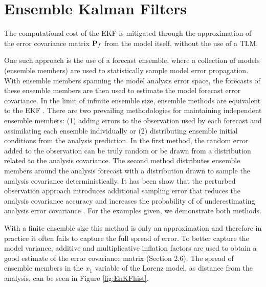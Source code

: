 \documentclass[12pt]{report}
\begin{document}
\section{Ensemble Kalman Filters}

The computational cost of the EKF is mitigated through the approximation of the error covariance matrix $\mathbf{P}_f$ from the model itself, without the use of a TLM.

One such approach is the use of a forecast ensemble, where a collection of models (ensemble members) are used to statistically sample model error propagation.
With ensemble members spanning the model analysis error space, the forecasts of these ensemble members are then used to estimate the model forecast error covariance.
In the limit of infinite ensemble size, ensemble methods are equivalent to the EKF .
There are two prevailing methodologies for maintaining independent ensemble members: (1) adding errors to the observation used by each forecast and assimilating each ensemble individually or (2) distributing ensemble initial conditions from the analysis prediction.
In the first method, the random error added to the observation can be truly random  or be drawn from a distribution related to the analysis covariance.
The second method distributes ensemble members around the analysis forecast with a distribution drawn to sample the analysis covariance deterministically.
It has been show that the perturbed observation approach introduces additional sampling error that reduces the analysis covariance accuracy and increases the probability of of underestimating analysis error covariance .
For the examples given, we demonstrate both methods.

With a finite ensemble size this method is only an approximation and therefore in practice it often fails to capture the full spread of error.
To better capture the model variance, additive and multiplicative inflation factors are used to obtain a good estimate of the error covariance matrix (Section 2.6).
The spread of ensemble members in the $x_1$ variable of the Lorenz model, as distance from the analysis, can be seen in Figure \ref{fig:EnKFhist}.
\end{document}

